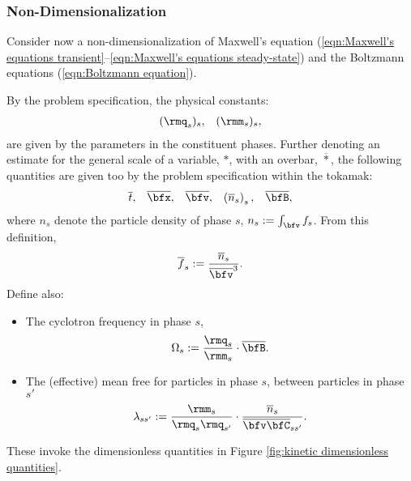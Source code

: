 \subsubsection{Non-Dimensionalization}
    Consider now a non-dimensionalization of Maxwell's equation (\ref{eqn:Maxwell's equations transient}--\ref{eqn:Maxwell's equations steady-state}) and the Boltzmann equations (\ref{eqn:Boltzmann equation}).
    
    By the problem specification, the physical constants:
    \begin{align}
        (\rmq_{s})_{s},  &&
        (\rmm_{s})_{s},
    \end{align}
    are given by the parameters in the constituent phases. Further denoting an estimate for the general scale of a variable, $*$, with an overbar, $\overline{*}$, the following quantities are given too by the problem specification within the tokamak:
    \begin{align}
        \overline{t},                       &&
        \overline{\bfx},                    &&
        \overline{\bfv},                    &&
        \left(\overline{n}_{s}\right)_{s},  &&
        \overline{\bfB},
    \end{align}
    where $n_{s}$ denote the particle density of phase $s$, $n_{s}  :=  \int_{\bfv}f_{s}$. From this definition,
    \begin{equation}
        \overline{f}_{s}  :=  \frac{\overline{n}_{s}}{\overline{\bfv}^{3}}.
    \end{equation}
    Define also:
    \begin{itemize}
        \item  The cyclotron frequency in phase $s$,
        \begin{equation}
            \Omega_{s}  :=  \frac{\rmq_{s}}{\rmm_{s}}\cdot\overline{\bfB}.
        \end{equation}
        \item  The (effective) mean free for particles in phase $s$, between particles in phase $s'$
        \begin{equation}
            \lambda_{ss'}  :=  \frac{\rmm_{s}}{\rmq_{s}\rmq_{s'}}\cdot\frac{\overline{n}_{s}}{\overline{\bfv}\overline{\bfC}_{ss'}}.
        \end{equation}
    \end{itemize}

    These invoke the dimensionless quantities in Figure \ref{fig:kinetic dimensionless quantities}.

